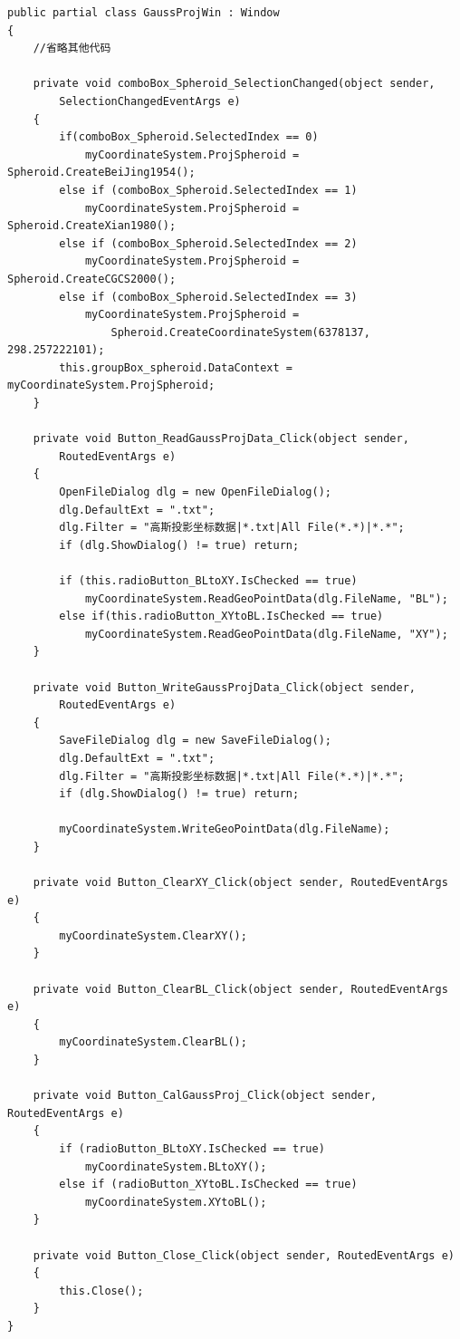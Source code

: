 \begin{lstlisting}
public partial class GaussProjWin : Window
{   
    //省略其他代码

    private void comboBox_Spheroid_SelectionChanged(object sender, 
        SelectionChangedEventArgs e)
    {
        if(comboBox_Spheroid.SelectedIndex == 0)
            myCoordinateSystem.ProjSpheroid = Spheroid.CreateBeiJing1954();
        else if (comboBox_Spheroid.SelectedIndex == 1)
            myCoordinateSystem.ProjSpheroid = Spheroid.CreateXian1980();
        else if (comboBox_Spheroid.SelectedIndex == 2)
            myCoordinateSystem.ProjSpheroid = Spheroid.CreateCGCS2000();
        else if (comboBox_Spheroid.SelectedIndex == 3)
            myCoordinateSystem.ProjSpheroid = 
                Spheroid.CreateCoordinateSystem(6378137, 298.257222101);
        this.groupBox_spheroid.DataContext = myCoordinateSystem.ProjSpheroid;
    }

    private void Button_ReadGaussProjData_Click(object sender,
        RoutedEventArgs e)
    {
        OpenFileDialog dlg = new OpenFileDialog();
        dlg.DefaultExt = ".txt";
        dlg.Filter = "高斯投影坐标数据|*.txt|All File(*.*)|*.*";
        if (dlg.ShowDialog() != true) return;

        if (this.radioButton_BLtoXY.IsChecked == true)
            myCoordinateSystem.ReadGeoPointData(dlg.FileName, "BL");
        else if(this.radioButton_XYtoBL.IsChecked == true)
            myCoordinateSystem.ReadGeoPointData(dlg.FileName, "XY");
    }

    private void Button_WriteGaussProjData_Click(object sender, 
        RoutedEventArgs e)
    {
        SaveFileDialog dlg = new SaveFileDialog();
        dlg.DefaultExt = ".txt";
        dlg.Filter = "高斯投影坐标数据|*.txt|All File(*.*)|*.*";
        if (dlg.ShowDialog() != true) return;

        myCoordinateSystem.WriteGeoPointData(dlg.FileName);
    }

    private void Button_ClearXY_Click(object sender, RoutedEventArgs e)
    {
        myCoordinateSystem.ClearXY();
    }

    private void Button_ClearBL_Click(object sender, RoutedEventArgs e)
    {
        myCoordinateSystem.ClearBL();
    }

    private void Button_CalGaussProj_Click(object sender, RoutedEventArgs e)
    {
        if (radioButton_BLtoXY.IsChecked == true)
            myCoordinateSystem.BLtoXY();
        else if (radioButton_XYtoBL.IsChecked == true)
            myCoordinateSystem.XYtoBL();
    }

    private void Button_Close_Click(object sender, RoutedEventArgs e)
    {
        this.Close();
    }
}
\end{lstlisting}

